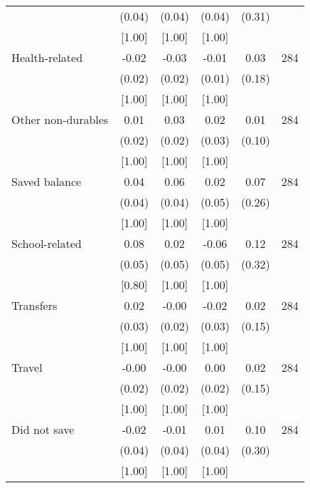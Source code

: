 \begin{table}[ht]
{\begin{threeparttable}
\begin{tabular}{l*{5}{c}}
          &   (0.04)&   (0.04)&   (0.04)&   (0.31)&         \\
          &   [1.00]&   [1.00]&   [1.00]&         &         \\
Health-related&    -0.02&-0.03\sym{*}&    -0.01&     0.03&      284\\
          &   (0.02)&   (0.02)&   (0.01)&   (0.18)&         \\
          &   [1.00]&   [1.00]&   [1.00]&         &         \\
Other non-durables&     0.01&     0.03&     0.02&     0.01&      284\\
          &   (0.02)&   (0.02)&   (0.03)&   (0.10)&         \\
          &   [1.00]&   [1.00]&   [1.00]&         &         \\
Saved balance&     0.04&     0.06&     0.02&     0.07&      284\\
          &   (0.04)&   (0.04)&   (0.05)&   (0.26)&         \\
          &   [1.00]&   [1.00]&   [1.00]&         &         \\
School-related&     0.08&     0.02&    -0.06&     0.12&      284\\
          &   (0.05)&   (0.05)&   (0.05)&   (0.32)&         \\
          &   [0.80]&   [1.00]&   [1.00]&         &         \\
Transfers &     0.02&    -0.00&    -0.02&     0.02&      284\\
          &   (0.03)&   (0.02)&   (0.03)&   (0.15)&         \\
          &   [1.00]&   [1.00]&   [1.00]&         &         \\
Travel    &    -0.00&    -0.00&     0.00&     0.02&      284\\
          &   (0.02)&   (0.02)&   (0.02)&   (0.15)&         \\
          &   [1.00]&   [1.00]&   [1.00]&         &         \\
Did not save&    -0.02&    -0.01&     0.01&     0.10&      284\\
          &   (0.04)&   (0.04)&   (0.04)&   (0.30)&         \\
          &   [1.00]&   [1.00]&   [1.00]&         &         \\
\bottomrule \end{tabular} \begin{tablenotes}[flushleft] \footnotesize \item  \end{tablenotes} \end{threeparttable} } \end{table}
